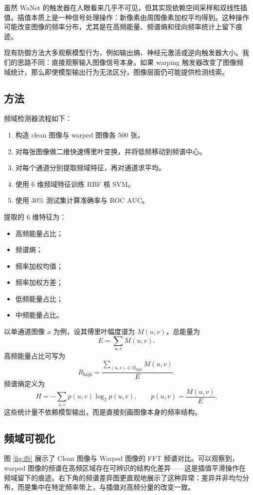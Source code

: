 \documentclass[UTF8,zihao=-4]{ctexart}
\begin{document}
虽然 WaNet 的触发器在人眼看来几乎不可见，但其实现依赖空间采样和双线性插值。插值本质上是一种信号处理操作：新像素由周围像素加权平均得到。这种操作可能改变图像的频率分布，尤其是在高频能量、频谱熵和径向频率统计上留下痕迹。

现有防御方法大多观察模型行为，例如输出熵、神经元激活或逆向触发器大小。我们的思路不同：直接观察输入图像信号本身。如果 warping 触发器改变了图像频域统计，那么即使模型输出行为无法区分，图像层面仍可能提供检测线索。

\subsection{方法}

频域检测器流程如下：
\begin{enumerate}
    \item 构造 clean 图像与 warped 图像各 500 张。
    \item 对每张图像做二维快速傅里叶变换，并将低频移动到频谱中心。
    \item 对每个通道分别提取频域特征，再对通道求平均。
    \item 使用 6 维频域特征训练 RBF 核 SVM。
    \item 使用 30\% 测试集计算准确率与 ROC AUC。
\end{enumerate}

提取的 6 维特征为：
\begin{itemize}
    \item 高频能量占比；
    \item 频谱熵；
    \item 频率加权均值；
    \item 频率加权方差；
    \item 低频能量占比；
    \item 中频能量占比。
\end{itemize}

以单通道图像 $x$ 为例，设其傅里叶幅度谱为 $M(u,v)$，总能量为
\[
    E = \sum_{u,v} M(u,v).
\]
高频能量占比可写为
\[
    R_{\text{high}} = \frac{\sum_{(u,v)\in \Omega_{\text{high}}} M(u,v)}{E}.
\]
频谱熵定义为
\[
    H = -\sum_{u,v} p(u,v)\log_2 p(u,v), \qquad
    p(u,v)=\frac{M(u,v)}{E}.
\]
这些统计量不依赖模型输出，而是直接刻画图像本身的频率结构。

\subsection{频域可视化}

图 \ref{fig:fft} 展示了 Clean 图像与 Warped 图像的 FFT 频谱对比。可以观察到，warped 图像的频谱在高频区域存在可辨识的结构化差异——这是插值平滑操作在频域留下的痕迹。右下角的频谱差异图更直观地展示了这种异常：差异并非均匀分布，而是集中在特定频率带上，与插值对高频分量的改变一致。
\end{document}
